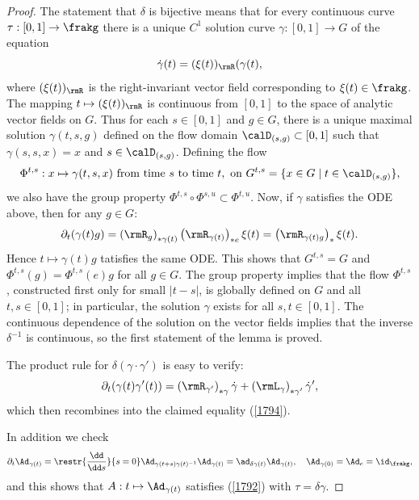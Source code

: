 \begin{proof}
    The statement that $\delta$ is bijective means that for every continuous curve $\tau:[0,1]\to\frakg$ there is a unique $C^1$ solution curve $\gamma:[0,1]\to G$ of the equation
    \[\dot\gamma(t)=(\xi(t))_\rmR(\gamma(t),\]
    where $(\xi(t))_\rmR$ is the right-invariant vector field corresponding to $\xi(t)\in\frakg$. The mapping $t\mapsto (\xi(t))_\rmR$ is continuous from $[0,1]$ to the space of analytic vector fields on $G$. Thus for each $s\in[0,1]$ and $g\in G$, there is a unique maximal solution $\gamma(t,s,g)$ defined on the flow domain $\calD_{(s,g)}\subset [0,1]$ such that $\gamma(s,s,x)=x$ and $s\in \calD_{(s,g)}$. Defining the flow
    \[\Phi^{t,s}:x\mapsto \gamma(t,s,x)\text{ from time }s\text{ to time }t,\text{ on }G^{t,s}=\{x\in G\mid t\in \calD_{(s,g)}\},\]
    we also have the group property $\Phi^{t,s}\circ \Phi^{s,u}\subset \Phi^{t,u}$. Now, if $\gamma$ satisfies the ODE above, then for any $g\in G$:
    \[\partial_t(\gamma(t)g)=\left(\rmR_{g}\right)_{\ast \gamma(t)} \left(\rmR_{\gamma(t)}\right)_{\ast e}\xi(t)=\left(\rmR_{\gamma(t)g}\right)_{\ast}\xi(t).\]
    Hence $t\mapsto \gamma(t)g$ tatisfies the same ODE. This shows that $G^{t,s}=G$ and $\Phi^{t,s}(g)=\Phi^{t,s}(e)g$ for all $g\in G$. The group property implies that the flow $\Phi^{t,s}$, constructed first only for small $|t-s|$, is globally defined on $G$ and all $t,s\in[0,1]$; in particular, the solution $\gamma$ exists for all $s,t\in [0,1]$. The continuous dependence of the solution on the vector fields implies that the inverse $\delta^{-1}$ is continuous, so the first statement of the lemma is proved.

    The product rule for $\delta(\gamma\cdot\gamma')$ is easy to verify:
    \[\partial_t(\gamma(t)\gamma'(t))=\left(\rmR_{\gamma'}\right)_{\ast \gamma}\dot\gamma+ \left(\rmL_{\gamma}\right)_{\ast \gamma'}\dot\gamma',\]
    which then recombines into the claimed equality (\ref{1794}).

    In addition we check 
    \[\partial_t \Ad_{\gamma(t)}=\restr{\frac{\dd}{\dd s}}{s=0}\Ad_{\gamma(t+s)\gamma(t)^{-1}}\Ad_{\gamma(t)}=\ad_{\delta \gamma(t)}\Ad_{\gamma(t)},\quad \Ad_{\gamma(0)}=\Ad_e=\id_\frakg,\]
    and this shows that $A:t\mapsto \Ad_{\gamma(t)}$ satisfies (\ref{1792}) with $\tau=\delta\gamma$.


\end{proof}
